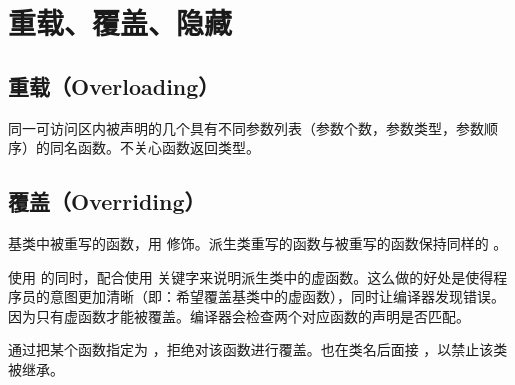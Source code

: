 \documentclass[letterpaper,10pt,english]{sphinxmanual}
\begin{document}
\section{重载、覆盖、隐藏}
\label{\detokenize{cpp/08_overload::doc}}\label{\detokenize{cpp/08_overload:id1}}

\subsection{重载（Overloading）}
\label{\detokenize{cpp/08_overload:overloading}}
同一可访问区内被声明的几个具有不同参数列表（参数个数，参数类型，参数顺序）的同名函数。不关心函数返回类型。


\subsection{覆盖（Overriding）}
\label{\detokenize{cpp/08_overload:overriding}}
基类中被重写的函数，用  修饰。派生类重写的函数与被重写的函数保持同样的  。

使用  的同时，配合使用  关键字来说明派生类中的虚函数。这么做的好处是使得程序员的意图更加清晰（即：希望覆盖基类中的虚函数），同时让编译器发现错误。
因为只有虚函数才能被覆盖。编译器会检查两个对应函数的声明是否匹配。

通过把某个函数指定为  ，拒绝对该函数进行覆盖。也在类名后面接  ，以禁止该类被继承。
\end{document}
